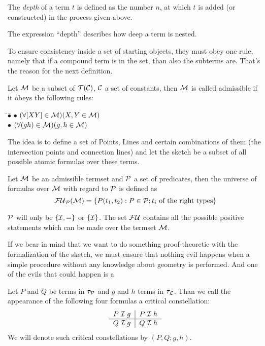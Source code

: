 \begin{definition}[Depth] The \emph{depth} of a term
$t$ is defined as the number $n$, at which $t$ is
added (or constructed) in the process given above.
\end{definition}

The expression ``depth'' describes how deep a term is nested.

To ensure consistency inside a set
of starting objects, they must obey one rule, namely that if a
compound term is in the set, than also the subterms are. That's the
reason for the next definition.

\begin{definition} Let $\cM$  be a
subset of $\cT(\cC)$, $\cC$ a set of constants, then $\cM$ is called
admissible if it obeys the
following rules:
\begin{tabbing} \qquad\=$\bullet$\quad\=\kill
\> $\bullet$ \> $(\forall [XY]\in\cM)(X,Y\in\cM)$\\
\> $\bullet$ \> $(\forall (gh)\in\cM)(g,h\in\cM)$
\end{tabbing}
\end{definition}

The idea is to define a set of Points, Lines and certain combinations
of them (the intersection points and connection lines) and let the
sketch be a subset of all possible atomic formulas over these terms.

\begin{definition} Let $\cM$ be an
admissible termset and $\cP$ a set of predicates, then the
universe of formulas over $\cM$ with regard to $\cP$ is
defined as
$$\fu_\cP(\cM) = \{P(t_1,t_2) : P\in\cP; t_i \text{ of the right
                                                types}\}$$
\end{definition}

$\cP$ will only be $\{\cI,=\}$ or $\{\cI\}$. The set $\fu$ contains
all the possible positive statements which can be made over the
termset $\cM$.

If we bear in mind that we want to do something proof-theoretic with
the formalization of the sketch, we must ensure that nothing evil
happens when a simple procedure without any knowledge about geometry
is performed. And one of the evils that could happen is a

\begin{definition} Let $P$ and $Q$ be terms in
$\typpo$ and $g$ and $h$ terms in $\typli$. Than we call the
appearance of the following four formulas a critical
constellation:
\[\begin{tabular}[c]{c|c}
\strut$P\cI g$ & $P\cI h$\\\hline
\strut$Q\cI g$ & $Q\cI h$\\
\end{tabular}\]
We will denote such critical constellations by $(P,Q;g,h)$.
\end{definition}

